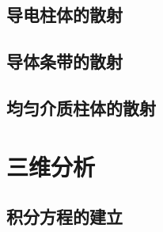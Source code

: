 \subsection{导电柱体的散射}

\subsection{导体条带的散射}

\subsection{均匀介质柱体的散射}

\section{三维分析}

\subsection{积分方程的建立}

